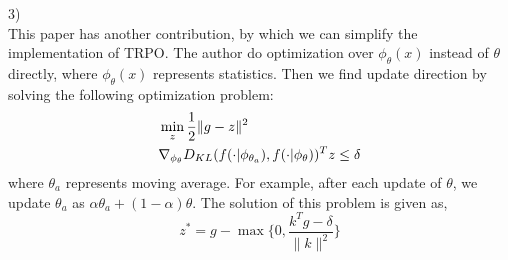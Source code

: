 \documentclass[11pt,a4paper]{article}
\begin{document}
3)\\ 
This paper has another contribution, by which we can simplify the implementation of TRPO. The author do optimization over $\phi_{\theta}(x)$ instead of $\theta$ directly, where $\phi_\theta(x)$ represents statistics. Then we find update direction by solving the following optimization problem:
\begin{equation}
    \aligned 
    & \min_z \frac{1}{2}\|g - z\|^2 \\
    & \nabla_{\phi_\theta} D_{KL}(f(\cdot|\phi_{\theta_a}),f(\cdot|\phi_\theta))^T z \le \delta   
    \endaligned  
\end{equation}
where $\theta_a$ represents moving average. For example, after each update of $\theta$, we update $\theta_a$ as $\alpha \theta_a + (1-\alpha)\theta$.
The solution of this problem is given as,
\begin{equation}
    z^* = g - \max\{0, \frac{k^Tg -\delta}{\|k\|^2}\}
\end{equation}
\end{document}
